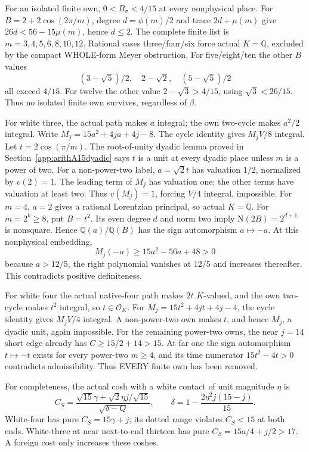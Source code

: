 \documentclass[11pt]{article}
\begin{document}
For an isolated finite own,
\(0<B_\sigma<4/15\) at every nonphysical place.
For \(B=2+2\cos(2\pi/m)\), degree \(d=\phi(m)/2\)
and trace \(2d+\mu(m)\) give
\(26d<56-15\mu(m)\), hence \(d\le2\).
The complete finite list is \(m=3,4,5,6,8,10,12\).
Rational cases three/four/six force actual \(K=\mathbb Q\),
excluded by the compact WHOLE-form Meyer obstruction.
For five/eight/ten the other \(B\) values
\[
 (3-\sqrt5)/2,\quad2-\sqrt2,\quad(5-\sqrt5)/2
\]
all exceed \(4/15\).
For twelve the other value \(2-\sqrt3>4/15\),
using \(\sqrt3<26/15\).
Thus no isolated finite own survives, regardless of \(\beta\).

For white three, the actual path makes \(a\) integral;
the own two-cycle makes \(a^2/2\) integral.
Write \(M_j=15a^2+4ja+4j-8\).
The cycle identity gives \(M_jV/8\) integral.
Let \(t=2\cos(\pi/m)\).
The root-of-unity dyadic lemma proved in
Section~\ref{app:arithA15dyadic} says \(t\) is a unit
at every dyadic place unless \(m\) is a power of two.
For a non-power-two label, \(a=\sqrt2t\) has
valuation \(1/2\), normalized by \(v(2)=1\).
The leading term of \(M_j\) has valuation one;
the other terms have valuation at least two.
Thus \(v(M_j)=1\), forcing \(V/4\) integral, impossible.
For \(m=4\), \(a=2\) gives a rational Lorentzian
principal, so actual \(K=\mathbb Q\).
For \(m=2^k\ge8\), put \(B=t^2\).
Its even degree \(d\) and norm two imply
\(\mathrm N(2B)=2^{d+1}\) is nonsquare.
Hence \(\mathbb Q(a)/\mathbb Q(B)\) has the sign
automorphism \(a\mapsto-a\).
At this nonphysical embedding,
\[
                  M_j(-a)\ge15a^2-56a+48>0
\]
because \(a>12/5\), the right polynomial vanishes
at \(12/5\) and increases thereafter.
This contradicts positive definiteness.

For white four the actual native-four path makes
\(2t\) \(K\)-valued, and the own two-cycle makes
\(t^2\) integral, so \(t\in\mathcal O_K\).
For \(M_j=15t^2+4jt+4j-4\), the cycle identity
gives \(M_jV/4\) integral.
A non-power-two own makes \(t\), and hence \(M_j\),
a dyadic unit, again impossible.
For the remaining power-two owns, the near \(j=14\)
short edge already has \(C\ge15/2+14>15\).
At far one the sign automorphism \(t\mapsto-t\)
exists for every power-two \(m\ge4\), and its time
numerator \(15t^2-4t>0\) contradicts admissibility.
Thus EVERY finite own has been removed.

For completeness, the actual cosh with a white contact
of unit magnitude \(\eta\) is
\[
 C_S={\frac{\sqrt{15}\gamma+\sqrt2\eta j/\sqrt{15}}{\sqrt{\delta-Q}}},\qquad
 \delta=1-{\frac{2\eta^2j(15-j)}{15}}.
\]
White-four has pure \(C_S=15\gamma+j\);
its dotted range violates \(C_S<15\) at both ends.
White-three at near next-to-end thirteen has pure
\(C_S=15a/4+j/2>17\).
A foreign cost only increases these coshes.
\end{document}
